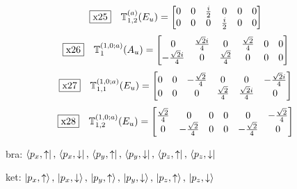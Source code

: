 \documentclass[fleqn,10pt,landscape]{jsarticle}
\begin{document}
\begin{dmath*}
\fbox{x25}\quad \mathbb{T}_{1,2}^{(a)}(E_{u})=\begin{bmatrix} 0 & 0 & \frac{i}{2} & 0 & 0 & 0 \\ 0 & 0 & 0 & \frac{i}{2} & 0 & 0 \end{bmatrix}
\end{dmath*}
\begin{dmath*}
\fbox{x26}\quad \mathbb{T}_{1}^{(1,0;a)}(A_{u})=\begin{bmatrix} 0 & \frac{\sqrt{2} i}{4} & 0 & \frac{\sqrt{2}}{4} & 0 & 0 \\ - \frac{\sqrt{2} i}{4} & 0 & \frac{\sqrt{2}}{4} & 0 & 0 & 0 \end{bmatrix}
\end{dmath*}
\begin{dmath*}
\fbox{x27}\quad \mathbb{T}_{1,1}^{(1,0;a)}(E_{u})=\begin{bmatrix} 0 & 0 & - \frac{\sqrt{2}}{4} & 0 & 0 & - \frac{\sqrt{2} i}{4} \\ 0 & 0 & 0 & \frac{\sqrt{2}}{4} & \frac{\sqrt{2} i}{4} & 0 \end{bmatrix}
\end{dmath*}
\begin{dmath*}
\fbox{x28}\quad \mathbb{T}_{1,2}^{(1,0;a)}(E_{u})=\begin{bmatrix} \frac{\sqrt{2}}{4} & 0 & 0 & 0 & 0 & - \frac{\sqrt{2}}{4} \\ 0 & - \frac{\sqrt{2}}{4} & 0 & 0 & - \frac{\sqrt{2}}{4} & 0 \end{bmatrix}
\end{dmath*}
\vspace{5mm}

\noindent\textbullet\, bra: $\bra{p_{x},\uparrow},\, \bra{p_{x},\downarrow},\, \bra{p_{y},\uparrow},\, \bra{p_{y},\downarrow},\, \bra{p_{z},\uparrow},\, \bra{p_{z},\downarrow}$

\noindent\textbullet\, ket: $\ket{p_{x},\uparrow},\, \ket{p_{x},\downarrow},\, \ket{p_{y},\uparrow},\, \ket{p_{y},\downarrow},\, \ket{p_{z},\uparrow},\, \ket{p_{z},\downarrow}$
\end{document}
